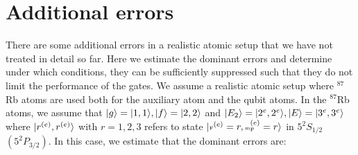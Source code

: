 \section{Additional errors} 
\label{app:Additional_errors}
There are some additional errors in a realistic atomic setup that we have not
treated in detail so far. Here we estimate the dominant errors and determine
under which conditions, they can be sufficiently suppressed such that they do
not limit the performance of the gates. We assume a realistic atomic setup where
${}^{87}$Rb atoms are used both for the auxiliary atom and the qubit atoms. In
the ${}^{87}$Rb atoms, we assume that $| g \rangle=| 1,1 \rangle, | f \rangle=| 2,2 \rangle$ and
$| E_{2} \rangle=| 2^{e},2^{e} \rangle, | E \rangle=| 3^{e},3^{e} \rangle$ where
$| r^{(e)},r^{(e)} \rangle$ with $r=1,2,3$ refers to state
$| \mbox{\tiny F}^{(e)}=r,\mbox{\tiny m}_{\mbox{\tiny F}}^{(e)}=r \rangle$ in $5^{2}S_{1/2}$
$(5^{2}P_{3/2})$. In this case, we estimate that the dominant errors are:
